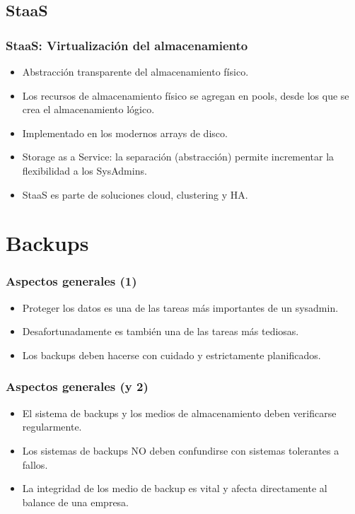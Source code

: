 \documentclass{beamer}
\begin{document}
\subsection{StaaS}
\begin{frame}
  \frametitle{StaaS: Virtualización del almacenamiento}
  \begin{itemize}
    \item Abstracción transparente del almacenamiento físico.
    \item Los recursos de almacenamiento físico se agregan en \alert{pools}, desde los que se crea el almacenamiento lógico.
    \item Implementado en los modernos arrays de disco.
    \item \alert{Storage as a Service}: la separación (abstracción) permite incrementar la flexibilidad a los SysAdmins. 
    \item StaaS es parte de soluciones \alert{cloud}, \alert{clustering} y \alert{HA}.
  \end{itemize}
\end{frame}



\section{Backups}


\begin{frame}
  \frametitle{Aspectos generales (1)}
  \begin{itemize}
    \item Proteger los datos es una de las tareas más importantes de un sysadmin.
    \item Desafortunadamente es también una de las tareas más tediosas.

    \item Los backups deben hacerse con cuidado y estrictamente planificados.
  \end{itemize}
\end{frame}

\begin{frame}
  \frametitle{Aspectos generales (y 2)}
  \begin{itemize}
    \item El sistema de backups y los medios de almacenamiento deben verificarse regularmente.
    \item Los sistemas de backups NO deben confundirse con sistemas tolerantes a fallos.
    \item La integridad de los medio de backup es vital y afecta directamente al balance de una empresa. 
  \end{itemize}
\end{frame}
\end{document}
